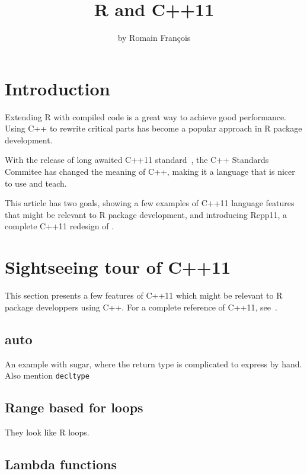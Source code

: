 \title{R and C++11}
\author{by Romain François}

\maketitle

\abstract{}

\section{Introduction}

Extending R with compiled code is a great way to achieve good performance. 
Using C++ to rewrite critical parts has become a popular approach
in R package development. 

With the release of long awaited C++11 standard~\citep{Cpp11}, 
the C++ Standards Commitee has changed the meaning of C++, making it 
a language that is nicer to use and teach. 

This article has two goals, 
showing a few examples of C++11 language features that might be 
relevant to R package development, and introducing
Rcpp11, a complete C++11 redesign of . 

\section{Sightseeing tour of C++11}

This section presents a few features of C++11 which might be 
relevant to R package developpers using C++. For a complete 
reference of C++11, see~\citep{Stroustrup2013}. 

\subsection{auto}

An example with sugar, where the return type is complicated to express
by hand. Also mention \texttt{decltype}

\subsection{Range based for loops}

They look like R loops. 

\subsection{Lambda functions}

